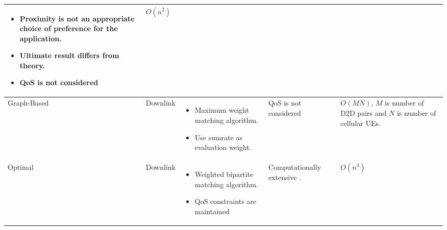 \documentclass[times]{dacauth}
\begin{document}
\begin{center}
\begin{table}[h!]
\begin{tabular}{ | m{5em} | m{5em} | m{9em} | m{9em}| m{5em} | }
\begin{itemize}[leftmargin=*]
    \item Proximity is not an appropriate choice of preference for the application.
    \item Ultimate result differs from theory.
    \item QoS is not considered
 \end{itemize}
&$O(n^2)$\\

\hline
Graph-Based	\cite{zhang}
&Downlink	
&\begin{itemize}[leftmargin=*]
    \item Maximum weight matching algorithm.
    \item Use sumrate as evaluation weight.
 \end{itemize}
&QoS is not considered
&$O(MN)$, $M$ is number of D2D pairs and $N$ is number of cellular UEs.\\

\hline
Optimal \cite{ccnc}	
&Downlink 	
&\begin{itemize}[leftmargin=*]
    \item Weighted bipartite matching algorithm.
    \item QoS constraints are maintained	
 \end{itemize}
&Computationally extensive .	
&$O(n^3)$\\
\hline

\end{tabular}

\end{table}
\end{center}
\end{document}
